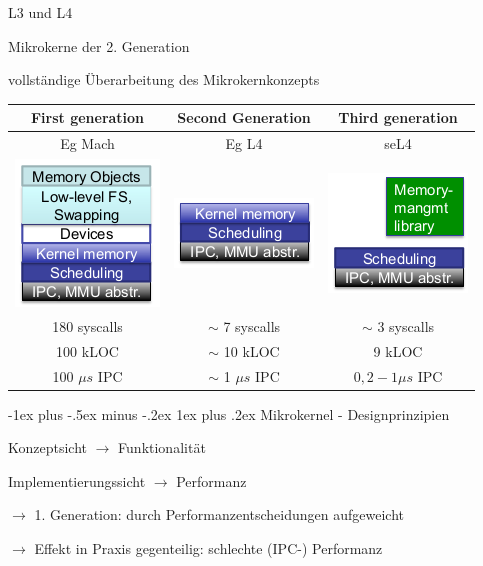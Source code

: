\documentclass[a4paper]{article}
\makeatletter
\renewcommand{\subsubsection}{\@startsection{subsubsection}{3}{0mm}%
 {-1ex plus -.5ex minus -.2ex}%
 {1ex plus .2ex}%
 {\normalfont\small\bfseries}}
\makeatother
\begin{document}
\begin{multicols}{3}
    L3 und L4
    \begin{itemize*}
        \item Mikrokerne der 2. Generation
        \item vollständige Überarbeitung des Mikrokernkonzepts
    \end{itemize*}
    \begin{tabular}{c|c|c}
        First generation                                                                      & Second Generation    & Third generation  \\\hline
        Eg Mach                                                                               & Eg L4                & seL4              \\
        \includegraphics[width=.2\linewidth]{Assets/AdvancedOperatingSystems-l4-first-g.png}  &
        \includegraphics[width=.2\linewidth]{Assets/AdvancedOperatingSystems-L4-second-g.png} &
        \includegraphics[width=.2\linewidth]{Assets/AdvancedOperatingSystems-l4-third-g.png}                                             \\
        180 syscalls                                                                          & $\sim$ 7 syscalls    & $\sim$ 3 syscalls \\
        100 kLOC                                                                              & $\sim$ 10 kLOC       & 9 kLOC            \\
        100 $\mu s$ IPC                                                                       & $\sim$ 1 $\mu s$ IPC & $0,2-1 \mu s$ IPC
    \end{tabular}

    \subsubsection{Mikrokernel - Designprinzipien}
    \begin{itemize*}
        \item Konzeptsicht $\rightarrow$ Funktionalität
        \item Implementierungssicht $\rightarrow$ Performanz
        \item[$\rightarrow$] 1. Generation: durch Performanzentscheidungen aufgeweicht
        \item[$\rightarrow$] Effekt in Praxis gegenteilig: schlechte (IPC-) Performanz
    \end{itemize*}


\end{multicols}
\end{document}

